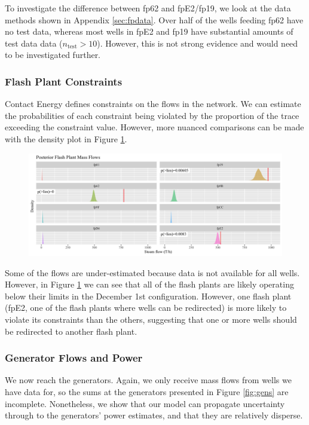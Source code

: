 \documentclass[a4paper, 12pt]{article}
\begin{document}
To investigate the difference between fp62 and fpE2/fp19, we look at the data methods shown in Appendix \ref{sec:fpdata}. Over half of the wells feeding fp62 have no test data, whereas most wells in fpE2 and fp19 have substantial amounts of test data data ($n_\text{test} > 10$). However, this is not strong evidence and would need to be investigated further.

\subsubsection{Flash Plant Constraints}
Contact Energy defines constraints on the flows in the network. We can estimate the probabilities of each constraint being violated by the proportion of the trace exceeding the constraint value. However, more nuanced comparisons can be made with the density plot in Figure \ref{fig:constraints}.

\begin{figure}
\centering
  \includegraphics[width=\linewidth]{media/constraints}
  \label{fig:constraints}
\end{figure}

Some of the flows are under-estimated because data is not available for all wells. However, in Figure \ref{fig:constraints} we can see that all of the flash plants are likely operating below their limits in the December 1st configuration. However, one flash plant (fpE2, one of the flash plants where wells can be redirected) is more likely to violate its constraints than the others, suggesting that one or more wells should be redirected to another flash plant.

\subsubsection{Generator Flows and Power}
We now reach the generators. Again, we only receive mass flows from wells we have data for, so the sums at the generators presented in Figure \ref{fig:gens} are incomplete. Nonetheless, we show that our model can propagate uncertainty through to the generators' power estimates, and that they are relatively disperse.
\end{document}
